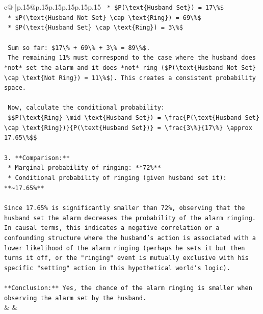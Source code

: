 \documentclass{article}
\begin{document}
{\begin{supertabular}{c@{$\;$}|p{.15\linewidth}@{}p{.15\linewidth}p{.15\linewidth}p{.15\linewidth}p{.15\linewidth}p{.15\linewidth}}
{{{\texttt{    *   \$P(\textbackslash{}text\{Husband Set\}) = 17\textbackslash{}\%\$} \\
\texttt{    *   \$P(\textbackslash{}text\{Husband Not Set\} \textbackslash{}cap \textbackslash{}text\{Ring\}) = 69\textbackslash{}\%\$} \\
\texttt{    *   \$P(\textbackslash{}text\{Husband Set\} \textbackslash{}cap \textbackslash{}text\{Ring\}) = 3\textbackslash{}\%\$} \\
\\ 
\texttt{    Sum so far: \$17\textbackslash{}\% + 69\textbackslash{}\% + 3\textbackslash{}\% = 89\textbackslash{}\%\$.} \\
\texttt{    The remaining 11\% must correspond to the case where the husband does *not* set the alarm and it does *not* ring (\$P(\textbackslash{}text\{Husband Not Set\} \textbackslash{}cap \textbackslash{}text\{Not Ring\}) = 11\textbackslash{}\%\$). This creates a consistent probability space.} \\
\\ 
\texttt{    Now, calculate the conditional probability:} \\
\texttt{    \$\$P(\textbackslash{}text\{Ring\} \textbackslash{}mid \textbackslash{}text\{Husband Set\}) = \textbackslash{}frac\{P(\textbackslash{}text\{Husband Set\} \textbackslash{}cap \textbackslash{}text\{Ring\})\}\{P(\textbackslash{}text\{Husband Set\})\} = \textbackslash{}frac\{3\textbackslash{}\%\}\{17\textbackslash{}\%\} \textbackslash{}approx 17.65\textbackslash{}\%\$\$} \\
\\ 
\texttt{3.  **Comparison:**} \\
\texttt{    *   Marginal probability of ringing: **72\%**} \\
\texttt{    *   Conditional probability of ringing (given husband set it): **\textasciitilde{}17.65\%**} \\
\\ 
\texttt{Since 17.65\% is significantly smaller than 72\%, observing that the husband set the alarm decreases the probability of the alarm ringing. In causal terms, this indicates a negative correlation or a confounding structure where the husband's action is associated with a lower likelihood of the alarm ringing (perhaps he sets it but then turns it off, or the "ringing" event is mutually exclusive with his specific "setting" action in this hypothetical world's logic).} \\
\\ 
\texttt{**Conclusion:** Yes, the chance of the alarm ringing is smaller when observing the alarm set by the husband.} \\
            }
        }
    }
    & & \\ \\


\end{supertabular}}
\end{document}
